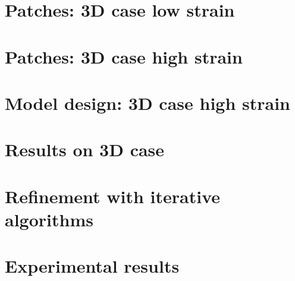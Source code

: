\section{Patches: 3D case low strain}\label{chp:patches_nostrain}


\section{Patches: 3D case high strain}\label{chp:patches_strain}

\section{Model design: 3D case high strain }\label{chp:3d_nostrain}

\section{Results on 3D case}\label{chp:phasing}
\section{Refinement with iterative algorithms}\label{chp:phasing}
\section{Experimental results}\label{chp:phasing}

